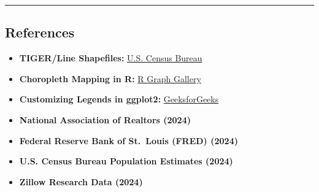 \documentclass[
]{article}
\providecommand{\tightlist}{%
  \setlength{\itemsep}{0pt}\setlength{\parskip}{0pt}}
\begin{document}
\begin{center}\rule{0.5\linewidth}{0.5pt}\end{center}

\subsection{References}\label{references}

\begin{itemize}
\tightlist
\item
  \textbf{TIGER/Line Shapefiles:}
  \href{https://www2.census.gov/geo/tiger/TIGER2024/}{U.S. Census
  Bureau}
\item
  \textbf{Choropleth Mapping in R:}
  \href{https://r-graph-gallery.com/327-chloropleth-map-from-geojson-with-ggplot2.html}{R
  Graph Gallery}
\item
  \textbf{Customizing Legends in ggplot2:}
  \href{https://www.geeksforgeeks.org/control-size-of-ggplot2-legend-items-in-r/}{GeeksforGeeks}
\item
  \textbf{National Association of Realtors (2024)}
\item
  \textbf{Federal Reserve Bank of St.~Louis (FRED) (2024)}
\item
  \textbf{U.S. Census Bureau Population Estimates (2024)}
\item
  \textbf{Zillow Research Data (2024)}
\end{itemize}
\end{document}
